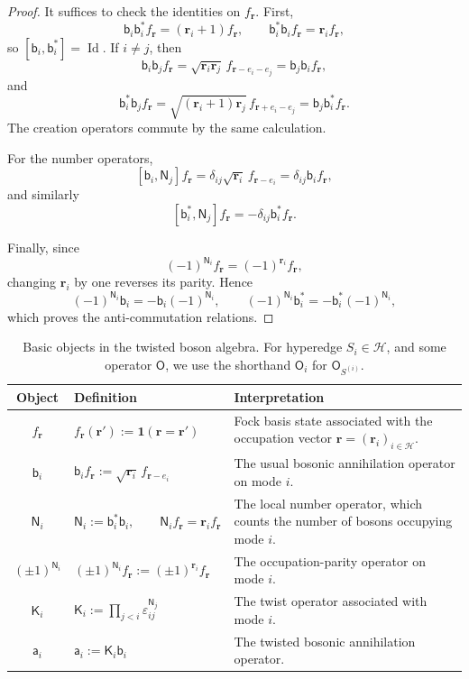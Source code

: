 \documentclass
[11pt,letterpaper]
{article}
\theoremstyle{definition}
\newcommand{\sfK}{\mathsf K}
\newcommand{\sfa}{\mathsf a}
\newcommand{\sfb}{\mathsf b}
\newcommand{\Num}{\mathsf N}
\newcommand{\eps}{\varepsilon}
\newcommand{\1}{\mathbf{1}}
\newcommand{\cH}{\mathcal H}
\newcommand{\Id}{\operatorname{Id}}
\begin{document}
\begin{proof}
It suffices to check the identities on \(f_{\bm r}\). First,
\[
\sfb_i\sfb_i^*f_{\bm r}
=
(\bm r_i+1)f_{\bm r},
\qquad
\sfb_i^*\sfb_i f_{\bm r}
=
\bm r_i f_{\bm r},
\]
so \([\sfb_i,\sfb_i^*]=\Id\). If \(i\neq j\), then
\[
\sfb_i\sfb_jf_{\bm r}
=
\sqrt{\bm r_i\bm r_j}\,
f_{\bm r-e_i-e_j}
=
\sfb_j\sfb_i f_{\bm r},
\]
and
\[
\sfb_i^*\sfb_j f_{\bm r}
=
\sqrt{(\bm r_i+1)\bm r_j}\,
f_{\bm r+e_i-e_j}
=
\sfb_j\sfb_i^*f_{\bm r}.
\]
The creation operators commute by the same calculation.

For the number operators,
\[
[\sfb_i,\Num_j]f_{\bm r}
=
\delta_{ij}\sqrt{\bm r_i}\,f_{\bm r-e_i}
=
\delta_{ij}\sfb_i f_{\bm r},
\]
and similarly
\[
[\sfb_i^*,\Num_j]f_{\bm r}
=
-\delta_{ij}\sfb_i^*f_{\bm r}.
\]

Finally, since
\[
(-1)^{\Num_i}f_{\bm r}
=
(-1)^{\bm r_i}f_{\bm r},
\]
changing \(\bm r_i\) by one reverses its parity. Hence
\[
(-1)^{\Num_i}\sfb_i
=
-\sfb_i(-1)^{\Num_i},
\qquad
(-1)^{\Num_i}\sfb_i^*
=
-\sfb_i^*(-1)^{\Num_i},
\]
which proves the anti-commutation relations.
\end{proof}

\begin{table}[t]
\centering
\renewcommand{\arraystretch}{1.45}
\begin{tabular}{|c|p{}|p{}|}
\hline
\textbf{Object}
&
\textbf{Definition}
&
\textbf{Interpretation}
\\
\hline

$f_{\bm r}$
&
$\displaystyle
f_{\bm r}(\bm r')
:=
\1(\bm r=\bm r')
$
&
Fock basis state associated with the occupation vector
$\bm r=(\bm r_i)_{i\in\cH}$. 
\\
\hline

$\sfb_i$
&
$\displaystyle
\sfb_i f_{\bm r}
:=
\sqrt{\bm r_i}\,
f_{\bm r-e_i}
$
&
The usual bosonic annihilation operator on mode $i$.
\\
\hline

$\Num_i$
&
$\displaystyle
\Num_i
:=
\sfb_i^{*}\sfb_i,
\qquad
\Num_i f_{\bm r}
=
\bm r_i f_{\bm r}
$
&
The local number operator, which counts the number of bosons occupying
mode $i$.
\\
\hline

$(\pm1)^{\Num_i}$
&
$\displaystyle
(\pm1)^{\Num_i}f_{\bm r}
:=
(\pm1)^{\bm r_i}f_{\bm r}
$
&
The occupation-parity operator on mode $i$. 
\\
\hline

$\sfK_i$
&
$\displaystyle
\sfK_i
:=
\prod_{j<i}
\eps_{ij}^{\Num_j}
$
&
The twist operator associated with mode $i$.
\\
\hline

$\sfa_i$
&
$\displaystyle
\sfa_i
:=
\sfK_i\sfb_i
$
&
The twisted bosonic annihilation operator.
\\
\hline

\end{tabular}

\caption{Basic objects in the twisted boson algebra. For hyperedge $S_i\in\cH$, and some operator $\mathsf{O}$, we use the shorthand $\mathsf{O}_i$ for $\mathsf{O}_{S^{(i)}}$. }
\label{tab:twisted-boson-algebra}
\end{table}
\end{document}
